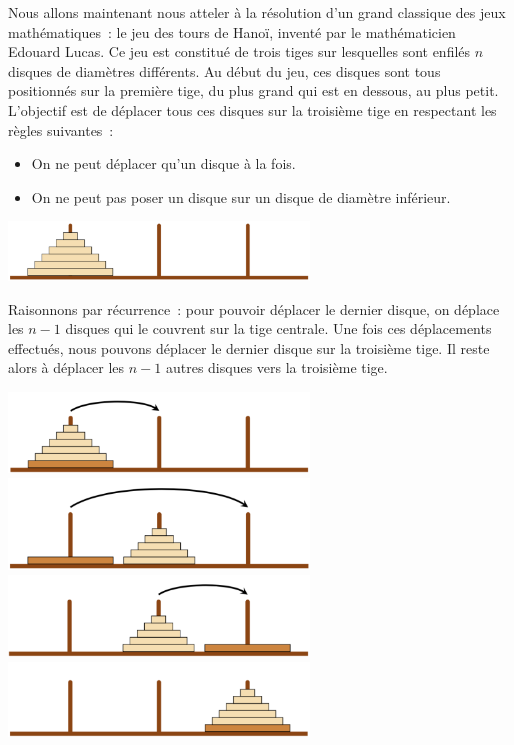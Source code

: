 \documentclass{magnolia}
\begin{document}
Nous allons maintenant nous atteler à la résolution d'un grand classique des jeux
mathématiques~: le jeu des tours de Hanoï, inventé par le mathématicien
Edouard Lucas. Ce jeu est constitué de trois tiges sur lesquelles sont enfilés $n$
disques de diamètres différents. Au début du jeu, ces disques sont tous positionnés
sur la première tige, du plus grand qui est en dessous, au plus petit. L'objectif
est de déplacer tous ces disques sur la troisième tige en respectant les règles
suivantes~:
\begin{itemize}
\item On ne peut déplacer qu'un disque à la fois.
\item On ne peut pas poser un disque sur un disque de diamètre inférieur.
\end{itemize}
\begin{center}
\includegraphics[width=0.6\textwidth]{../../Commun/Images/python-exos-rec-9.pdf}
\end{center}
Raisonnons par récurrence~: pour pouvoir déplacer le dernier disque, on déplace
les $n-1$ disques qui le couvrent sur la tige centrale. Une fois ces
déplacements effectués, nous pouvons déplacer le dernier disque sur la troisième
tige. Il reste alors à déplacer les $n-1$ autres disques vers la troisième tige.
\begin{center}
\includegraphics[width=0.6\textwidth]{../../Commun/Images/python-exos-rec-10.pdf}
\hspace{1cm}
\includegraphics[width=0.6\textwidth]{../../Commun/Images/python-exos-rec-11.pdf}
\hspace{1cm}
\includegraphics[width=0.6\textwidth]{../../Commun/Images/python-exos-rec-12.pdf}
\hspace{1cm}
\includegraphics[width=0.6\textwidth]{../../Commun/Images/python-exos-rec-13.pdf}
\end{center}
\end{document}
